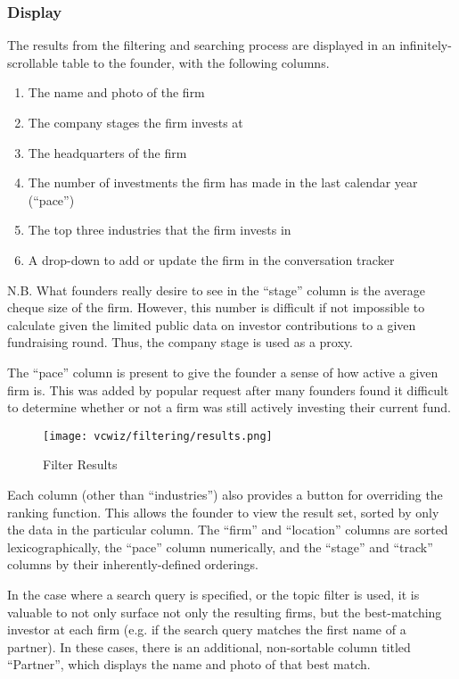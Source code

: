\subsubsection{Display}

The results from the filtering and searching process are displayed in an infinitely-scrollable table to the founder, with the following columns.

\begin{enumerate}
  \item The name and photo of the firm
  \item The company stages the firm invests at
  \item The headquarters of the firm
  \item The number of investments the firm has made in the last calendar year (``pace'')
  \item The top three industries that the firm invests in
  \item A drop-down to add or update the firm in the conversation tracker
\end{enumerate}

N.B. What founders really desire to see in the ``stage'' column is the average cheque size of the firm. However, this number is difficult if not impossible to calculate given the limited public data on investor contributions to a given fundraising round. Thus, the company stage is used as a proxy.

The ``pace'' column is present to give the founder a sense of how active a given firm is. This was added by popular request after many founders found it difficult to determine whether or not a firm was still actively investing their current fund.

\begin{figure}[ht]
  \texttt{[image: vcwiz/filtering/results.png]}
  \centering
  \caption*{Filter Results}
\end{figure}

Each column (other than ``industries'') also provides a button for overriding the ranking function. This allows the founder to view the result set, sorted by only the data in the particular column. The ``firm'' and ``location'' columns are sorted lexicographically, the ``pace'' column numerically, and the ``stage'' and ``track'' columns by their inherently-defined orderings.

In the case where a search query is specified, or the topic filter is used, it is valuable to not only surface not only the resulting firms, but the best-matching investor at each firm (e.g. if the search query matches the first name of a partner). In these cases, there is an additional, non-sortable column titled ``Partner'', which displays the name and photo of that best match.

